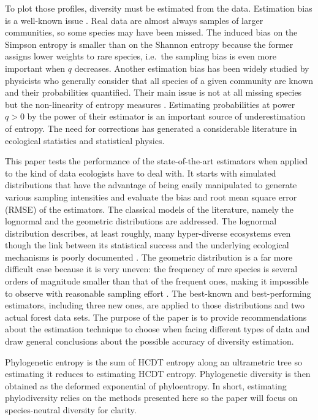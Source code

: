 \documentclass[fleqn,10pt]{latex/stylish_article} %
\begin{document}
To plot those profiles, diversity must be estimated from the data.
Estimation bias \citep[following the terminology of][]{Dauby2012} is a well-known issue \citep{Marcon2014a}.
Real data are almost always samples of larger communities, so some species may have been missed.
The induced bias on the Simpson entropy is smaller than on the Shannon entropy because the former assigns lower weights to rare species, i.e.~the sampling bias is even more important when \(q\) decreases.
Another estimation bias has been widely studied by physicists who generally consider that all species of a given community are known and their probabilities quantified.
Their main issue is not at all missing species but the non-linearity of entropy measures \citep[see][ for a short review]{Bonachela2008}.
Estimating probabilities at power \(q>0\) by the power of their estimator is an important source of underestimation of entropy.
The need for corrections has generated a considerable literature in ecological statistics and statistical physics.

This paper tests the performance of the state-of-the-art estimators when applied to the kind of data ecologists have to deal with.
It starts with simulated distributions that have the advantage of being easily manipulated to generate various sampling intensities and evaluate the bias and root mean square error (RMSE) of the estimators.
The classical models of the literature, namely the lognormal and the geometric distributions are addressed.
The lognormal distribution describes, at least roughly, many hyper-diverse ecosystems even though the link between its statistical success and the underlying ecological mechanisms is poorly documented \citep{Tokeshi1993}.
The geometric distribution is a far more difficult case because it is very uneven: the frequency of rare species is several orders of magnitude smaller than that of the frequent ones, making it impossible to observe with reasonable sampling effort \citep{Haegeman2013}.
The best-known and best-performing estimators, including three new ones, are applied to those distributions and two actual forest data sets.
The purpose of the paper is to provide recommendations about the estimation technique to choose when facing different types of data and draw general conclusions about the possible accuracy of diversity estimation.

Phylogenetic entropy is the sum of HCDT entropy along an ultrametric tree \citep{Marcon2014b} so estimating it reduces to estimating HCDT entropy.
Phylogenetic diversity is then obtained as the deformed exponential of phyloentropy.
In short, estimating phylodiversity relies on the methods presented here so the paper will focus on species-neutral diversity for clarity.
\end{document}
